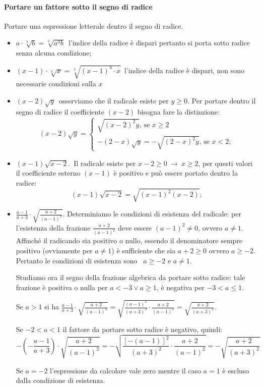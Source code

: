 \paragraph{Portare un fattore sotto il segno di radice}

 \begin{esempio}
 Portare una espressione letterale dentro il segno di radice.
 \begin{itemize}
 \item \(a\cdot \sqrt[3]b=\sqrt[3]{a^3b}\)\, l'indice della radice è dispari 
  pertanto si porta sotto radice senza alcuna condizione;
 \item \((x-1)\cdot \sqrt[3]x=\sqrt[3]{(x-1)^3\cdot x}\)\, l'indice della 
radice 
  è dispari, non sono necessarie condizioni sulla \(x\)
 \item \((x-2)\sqrt y\)\, osserviamo che il radicale esiste per \(y\ge 0\).
  Per portare dentro il segno di radice il coefficiente \((x-2)\) bisogna 
fare 
  la distinzione:
 \[
 (x-2)\sqrt y=\left\{\begin{array}{l}\sqrt{(x-2)^2y}\text{, se }x\ge 2\\
 -(2-x)\sqrt y=-\sqrt{(2-x)^2y}\text{, se }x<2;\end{array}\right.
 \]
 \item \((x-1)\sqrt{x-2}\).\, Il radicale esiste per \(x-2\ge 0\ \to \ x\ge 
2\), 
 per questi valori il coefficiente esterno \((x-1)\) è positivo e può essere 
 portato dentro la radice: \[(x-1)\sqrt{x-2}=\sqrt{(x-1)^2(x-2)};\]
 \item \(\frac{a-1}{a+3}\cdot \sqrt{\frac{a+2}{(a-1)^2}}\). Determiniamo le 
 condizioni di esistenza del radicale: per l'esistenza della frazione 
 \(\frac{a+2}{(a-1)^2}\) deve essere \((a-1)^2\neq 0\), ovvero \(a\neq 1\). 
 Affinché il radicando sia positivo o nullo, essendo il denominatore 
sempre positivo (ovviamente per \(a\neq 1\)) è sufficiente che sia 
\(a+2\geqslant 0\) ovvero \(a\geqslant -2\). 
 Pertanto le condizioni di esistenza sono~ \(a\geqslant -2\) e \(a\neq 1\).

 Studiamo ora il segno della frazione algebrica da portare sotto radice: 
 tale frazione è positiva o nulla per \(a<-3\vee a\geqslant 1\), è negativa 
 per \(-3<a\leqslant 1\).

 Se \(a>1\) si ha 
 \(\frac{a-1}{a+3}\cdot \sqrt{\frac{a+2}{(a-1)^2}}=
  \sqrt{\frac{(a-1)^2}{(a+3)^2}\cdot \frac{a+2}{(a-1)^2}}=
  \sqrt{\frac{a+2}{(a+3)^2}}\).

 Se \(-2<a<1\) il fattore da portare sotto radice è negativo, quindi:
 \[-\left(-\frac{a-1}{a+3}\right)\cdot \sqrt{\frac{a+2}{(a-1)^2}}=
   -\sqrt{\frac{[-(a-1)]^2}{(a+3)^2}\cdot \frac{a+2}{(a-1)^2}}=
   -\sqrt{\frac{a+2}{(a+3)^2}}\]

 Se \(a=-2\) l'espressione da calcolare vale zero mentre il caso \(a=1\) è 
escluso  dalla condizione di esistenza.
 \end{itemize}
 \end{esempio}

